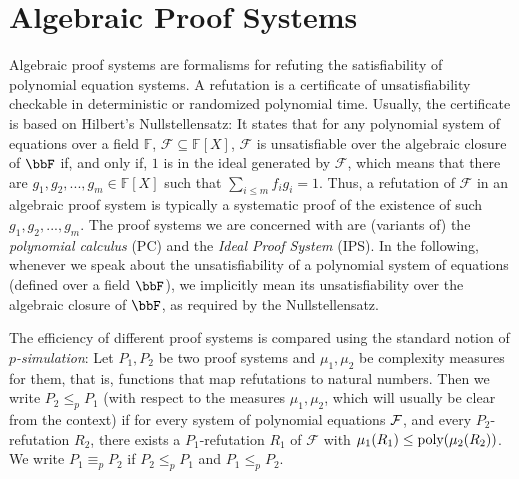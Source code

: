 \documentclass[10pt,a4paper]{article}
\newcommand{\Ff}{{\cal F}}
\newcommand{\poly}{\text{\upshape poly}}
\newcommand{\Field}{\ensuremath{\mathbb{F}}}
\newcommand{\F}{\ensuremath{\mathcal{F}}}
\begin{document}
	\section{Algebraic Proof Systems}
	\label{sec:proofSystems}
	Algebraic proof systems are formalisms for refuting the satisfiability of polynomial equation systems. 
	A refutation is a certificate of unsatisfiability checkable in deterministic or randomized polynomial time. 
	Usually, the certificate is based on Hilbert's Nullstellensatz: It states that for any polynomial system of equations over a field $\Field$,
	$\F \subseteq \Field[X]$, $\F$ is unsatisfiable over the algebraic closure of $\bbF$ if, and only if,
	$1$ is in the ideal generated by $\F$, which means that there are
	$g_1,g_2,...,g_m \in \Field[X]$ such that $\sum_{i \leq m}f_ig_i = 1$. 
	Thus, a refutation of $\F$ in an algebraic proof system is typically a systematic proof of the existence of such $g_1,g_2,...,g_m$.
	The proof systems we are concerned with are (variants of) the \emph{polynomial calculus} (PC) and the \emph{Ideal Proof System} (IPS).
	In the following, whenever we speak about the unsatisfiability of a polynomial system of equations (defined over a field $\bbF$), we implicitly mean its unsatisfiability over the algebraic closure of $\bbF$, as required by the Nullstellensatz. 
	
	The efficiency of different proof systems is compared using the standard notion of \emph{$p$-simulation}:
	Let $P_1,P_2$ be two proof systems and $\mu_1, \mu_2$ be complexity measures for them, that is, functions that map refutations to natural numbers.
	Then we write $P_2 \leq_p P_1$ (with respect to the measures $\mu_1, \mu_2$, which will usually be clear from the context) if for every system of polynomial equations $\Ff$, and every $P_2$-refutation $R_2$, there exists a $P_1$-refutation $R_1$ of $\F$ with $\mu_1(R_1) \leq \poly(\mu_2(R_2))$.
	We write $P_1 \equiv_p P_2$ if $P_2 \leq_p P_1$ and $P_1 \leq_p P_2$.
		
\end{document}
